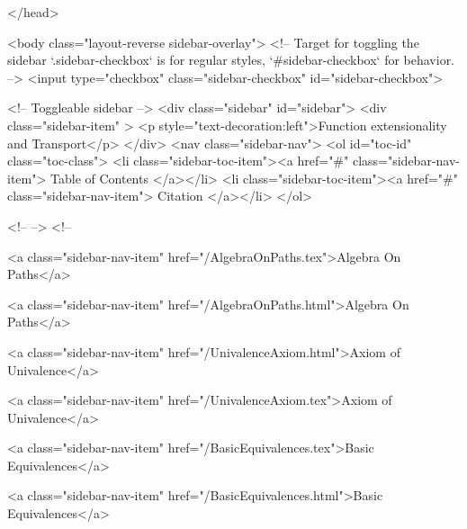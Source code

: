 </head>


  <body class="layout-reverse sidebar-overlay">
    <!-- Target for toggling the sidebar `.sidebar-checkbox` is for regular
     styles, `#sidebar-checkbox` for behavior. -->
<input type="checkbox" class="sidebar-checkbox" id="sidebar-checkbox">

<!-- Toggleable sidebar -->
<div class="sidebar" id="sidebar">
  <div class="sidebar-item" >
    <p style="text-decoration:left">Function extensionality and Transport</p>
  </div>
  <nav class="sidebar-nav">
    <ol id="toc-id" class="toc-class">
  <li class="sidebar-toc-item"><a href="#" class="sidebar-nav-item"> Table of Contents </a></li>
  <li class="sidebar-toc-item"><a href="#" class="sidebar-nav-item"> Citation </a></li>
</ol>


    <!--  -->
    <!-- 
      
    
      
    
      
    
      
        
      
    
      
        
          <a class="sidebar-nav-item" href="/AlgebraOnPaths.tex">Algebra On Paths</a>
        
      
    
      
        
          <a class="sidebar-nav-item" href="/AlgebraOnPaths.html">Algebra On Paths</a>
        
      
    
      
        
          <a class="sidebar-nav-item" href="/UnivalenceAxiom.html">Axiom of Univalence</a>
        
      
    
      
        
          <a class="sidebar-nav-item" href="/UnivalenceAxiom.tex">Axiom of Univalence</a>
        
      
    
      
        
          <a class="sidebar-nav-item" href="/BasicEquivalences.tex">Basic Equivalences</a>
        
      
    
      
        
          <a class="sidebar-nav-item" href="/BasicEquivalences.html">Basic Equivalences</a>
        
      
    
      
        
